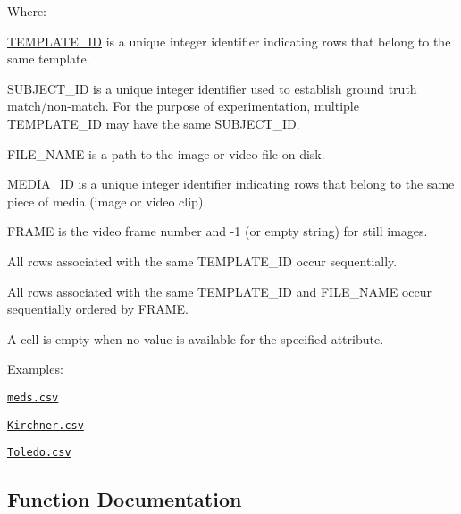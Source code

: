 Where\+:
\begin{DoxyItemize}
\item \hyperlink{group__janus_ga666a973aaa28bebd89ea5da37853bb87}{T\+E\+M\+P\+L\+A\+T\+E\+\_\+\+I\+D} is a unique integer identifier indicating rows that belong to the same template.
\item {\ttfamily S\+U\+B\+J\+E\+C\+T\+\_\+\+I\+D} is a unique integer identifier used to establish ground truth match/non-\/match. For the purpose of experimentation, multiple {\ttfamily T\+E\+M\+P\+L\+A\+T\+E\+\_\+\+I\+D} may have the same {\ttfamily S\+U\+B\+J\+E\+C\+T\+\_\+\+I\+D}.
\item {\ttfamily F\+I\+L\+E\+\_\+\+N\+A\+M\+E} is a path to the image or video file on disk.
\item {\ttfamily M\+E\+D\+I\+A\+\_\+\+I\+D} is a unique integer identifier indicating rows that belong to the same piece of media (image or video clip).
\item {\ttfamily F\+R\+A\+M\+E} is the video frame number and -\/1 (or empty string) for still images.
\item All rows associated with the same {\ttfamily T\+E\+M\+P\+L\+A\+T\+E\+\_\+\+I\+D} occur sequentially.
\item All rows associated with the same {\ttfamily T\+E\+M\+P\+L\+A\+T\+E\+\_\+\+I\+D} and {\ttfamily F\+I\+L\+E\+\_\+\+N\+A\+M\+E} occur sequentially ordered by {\ttfamily F\+R\+A\+M\+E}.
\item A cell is empty when no value is available for the specified attribute.
\end{DoxyItemize}

\begin{DoxyParagraph}{Examples\+:}

\begin{DoxyItemize}
\item \href{https://raw.githubusercontent.com/biometrics/janus/master/data/meds.csv}{\tt meds.\+csv}
\item \href{https://raw.githubusercontent.com/biometrics/janus/master/data/Kirchner.csv}{\tt Kirchner.\+csv}
\item \href{https://raw.githubusercontent.com/biometrics/janus/master/data/Toledo.csv}{\tt Toledo.\+csv} 
\end{DoxyItemize}
\end{DoxyParagraph}


\subsection{Function Documentation}
\hypertarget{group__janus__io_ga8c0bf830dd4a05136afbfe9a400e7209}{}
